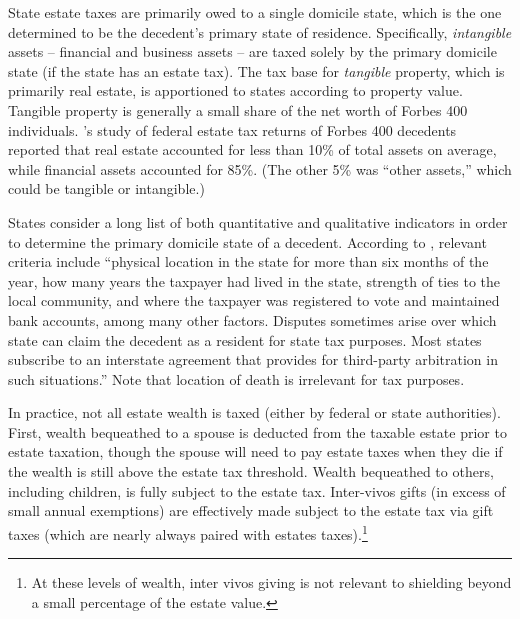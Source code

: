 \documentclass[12pt]{article}
\begin{document}
State estate taxes are primarily owed to a single domicile state, which is the one determined to be the decedent's primary state of residence. Specifically, \textit{intangible} assets -- financial and business assets -- are taxed solely by the primary domicile state (if the state has an estate tax). The tax base for \textit{tangible} property, which is primarily real estate, is apportioned to states according to property value. Tangible property is generally a small share of the net worth of Forbes 400 individuals. \cite{raub2010comparison}'s study of federal estate tax returns of Forbes 400 decedents reported that real estate accounted for less than 10\% of total assets on average, while financial assets accounted for 85\%. (The other 5\% was ``other assets,'' which could be tangible or intangible.)     

States consider a long list of both quantitative and qualitative indicators in order to determine the primary domicile state of a decedent.  According to \cite{bakija/slemrod:2004},  relevant criteria include  ``physical  location in the state for more than six months of the year, how many years the taxpayer had lived in the state, strength of ties to the local community, and where the taxpayer was registered to vote and maintained bank accounts, among many other factors. Disputes sometimes arise over which state can claim the decedent as a resident for state tax purposes. Most states subscribe to an interstate agreement that provides for third-party arbitration in such situations.'' Note that location of death is irrelevant for tax purposes.

In practice, not all estate wealth is taxed (either by federal or state authorities). First, wealth bequeathed to a spouse is deducted from the taxable estate prior to estate taxation, though the spouse will need to pay estate taxes when they die if the wealth is still above the estate tax threshold. Wealth bequeathed to others, including children, is fully subject to the estate tax.  Inter-vivos gifts (in excess of small annual exemptions) are effectively made subject to the estate tax via gift taxes (which are nearly always paired with estates taxes).\footnote{At these levels of wealth, inter vivos giving is not relevant to shielding beyond a small percentage of the estate value.}
\end{document}
